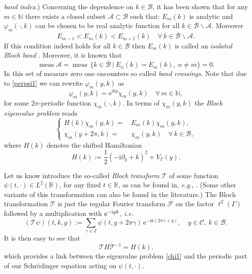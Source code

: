 \documentclass[leqno,final]{siamltex}
\numberwithin{equation}{section}
\newcounter{me}
\begin{document}
\emph{band index}.) Concerning the dependence on $k\in \mathcal
B$, it has been shown \cite{Wi} that for any $m\in {{\mathbb N }}$ there
exists a closed subset $\mathcal A\subset \mathcal B$ such that:
$E_m(k)$ is analytic and ${\varphi}_m(\cdot, k)$ can be chosen to be
real analytic function for all $k \in \overline{\mathcal B}
\backslash \mathcal A$. Moreover
\begin{equation}
\label{iso} E_{m-1} < E_m(k) < E_{m+1}(k)\quad \forall \, k \in
\overline{\mathcal B} \backslash \mathcal A.
\end{equation}
If this condition indeed holds for all $k\in \mathcal B$ then
$E_m(k)$ is called an \emph{isolated Bloch band} \cite{Te}.
Moreover, it is known that \begin{equation} \operatorname{meas} \mathcal A = \operatorname{meas} \, \{ k\in
\overline{\mathcal B} \ | \ E_n(k)=E_{m}(k), \ n\not = m \}=0. \end{equation}
In this set of measure zero one encounters so called \emph{band
crossings}. Note that due to \eqref{perpsi1} we can rewrite
${\varphi}_m(y,k)$ as \begin{equation} {\varphi}_m(y,k) = {\mathrm{e}}^{{\mathrm{i}} k y} \chi_m(y,k)\quad
\forall \, m \in {{\mathbb N }}, \end{equation} for some $2\pi$-periodic function
$\chi_m(\cdot,k)$. In terms of $\chi_m(y,k)$ the \emph{Bloch
eigenvalue problem} reads \begin{equation} \label{chi1} \left \{
\begin{aligned}
H(k) \chi_m(y,k)= & \, E_m(k)\chi_m(y,k),\\
\chi_m(y+2\pi ,k)=& \, \chi_m(y,k) \quad {\forall}  \, k\in \mathcal B,
\end{aligned}
\right. \end{equation} where $H(k)$ denotes the shifted Hamiltonian \begin{equation}
H(k):= {\frac{{1}}{{2}}}(-{\mathrm{i}}{\partial}_y+k)^2+V_{\Gamma}(y). \end{equation}

Let us know introduce the so-called \emph{Bloch transform}
$\mathcal T$ of some function $\psi(t,\cdot) \in L^2({{\mathbb R}})$, for any
fixed $t\in {{\mathbb R}}$, as can be found in, {{\sl e.g.\/}}, \cite{PST, Te}. (Some
other variants of this transformation can also be found in the
literature.) The Bloch transformation $\mathcal T$ is just the
regular Fourier transform $\mathcal F$ on the factor $\ell
^2(\Gamma)$ followed by a multiplication with ${\rm e}^{-{\mathrm{i}} y
k}$, {{\sl i.e.\/ }} \begin{equation} \label{btr} (\mathcal T \psi)(t,k,y):= \sum_{\gamma
\in {{\mathbb Z }}}\psi(t, y+ 2 \pi \gamma)\, {\mathrm{e}}^{-{\mathrm{i}} k ( 2\pi \gamma +y) }
,\quad
 y\in  {\mathcal C},\ k\in   {\mathcal B}.
\end{equation} It is then easy to see that \begin{equation} \mathcal T H {\mathcal T}^{-1}
= H(k). \end{equation} which provides a link between the eigenvalue problem
\eqref{chi1} and the periodic part of our Schr\"odinger equation
acting on $\psi(t,\cdot)$.
\end{document}
